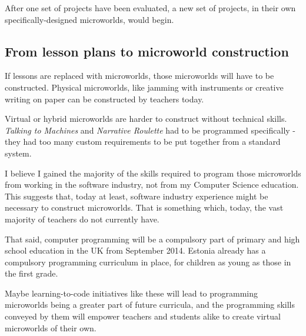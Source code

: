 After one set of projects have been evaluated, a new set of projects, in
their own specifically-designed microworlds, would begin.

\subsection{From lesson plans to microworld construction}

If lessons are replaced with microworlds, those microworlds will have to
be constructed. Physical microworlds, like jamming with instruments or
creative writing on paper can be constructed by teachers today.

Virtual or hybrid microworlds are harder to construct without technical
skills. \emph{Talking to Machines} and \emph{Narrative Roulette} had to
be programmed specifically - they had too many custom requirements to be
put together from a standard system.

I believe I gained the majority of the skills required to program those
microworlds from working in the software industry, not from my Computer
Science education. This suggests that, today at least, software industry experience might be necessary to construct microworlds. That is something which, today, the vast majority of teachers do not currently have.

That said, computer programming will be a compulsory part of primary and high school education in the UK from September 2014\cite{bbc:coding}. Estonia already has a compulsory programming curriculum in place, for children as young as those in the first grade\cite{forbes:estonia}.

Maybe learning-to-code initiatives like these will lead to programming microworlds being a greater part of future curricula, and the programming skills conveyed by them will empower teachers and students alike to create virtual microworlds of their own.
